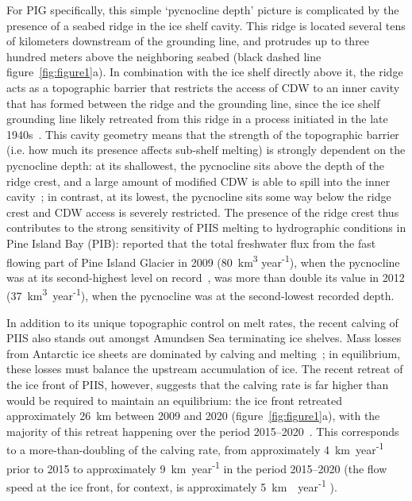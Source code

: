 \documentclass[draft]{agujournal2019}
\begin{document}
For PIG specifically, this simple `pycnocline depth' picture is complicated by the presence of a seabed ridge in the ice shelf cavity. This ridge is located several tens of kilometers downstream of the grounding line, and protrudes up to three hundred meters above the neighboring seabed (black dashed line figure~\ref{fig:figure1}a). In combination with the ice shelf directly above it, the ridge acts as a topographic barrier that restricts the access of CDW to an inner cavity that has formed between the ridge and the grounding line, since the ice shelf grounding line likely retreated from this ridge in a process initiated in the late 1940s~\cite{Jenkins2010NatureGeo, DeRydt2014JGeophysResOceans, DeRydt2016JGeophysResEarthSurf, Smith2017Nature}. This cavity geometry means that the strength of the topographic barrier (i.e. how much its presence affects sub-shelf melting) is strongly dependent on the pycnocline depth: at its shallowest, the pycnocline sits above the depth of the ridge crest, and a large amount of modified CDW is able to spill into the inner cavity~\cite{Dutrieux2014Science}; in contrast, at its lowest, the pycnocline sits some way below the ridge crest and CDW access is severely restricted.  The presence of the ridge crest thus contributes to the strong sensitivity of PIIS melting to hydrographic conditions in Pine Island Bay (PIB):  reported that the total freshwater flux from the fast flowing part of Pine Island Glacier in 2009 (80~km\textsuperscript{3} year\textsuperscript{-1}), when the pycnocline was at its second-highest level on record~\cite{Webber2017NatureComms}, was more than double its value in 2012 (37~km\textsuperscript{3}~year\textsuperscript{-1}), when the pycnocline was at the second-lowest recorded depth.

In addition to its unique topographic control on melt rates, the recent calving of PIIS also stands out amongst Amundsen Sea terminating ice shelves. Mass losses from Antarctic ice sheets are dominated by calving and melting~\cite{Rignot2013Science}; in equilibrium, these losses must balance the upstream accumulation of ice. The recent retreat of the ice front of PIIS, however, suggests that the calving rate is far higher than would be required to maintain an equilibrium: the ice front retreated approximately 26 km between 2009 and 2020 (figure~\ref{fig:figure1}a), with the majority of this retreat happening over the period 2015--2020~\cite{Lhermitte2020PNAS, Joughin2021ScienceAdv}. This corresponds to a more-than-doubling of the calving rate, from approximately 4~km~year\textsuperscript{-1} prior to 2015 to approximately 9~km~year\textsuperscript{-1} in the period 2015--2020 (the flow speed at the ice front, for context, is approximately 5~km~~year\textsuperscript{-1} \cite{Joughin2021ScienceAdv}).
\end{document}
